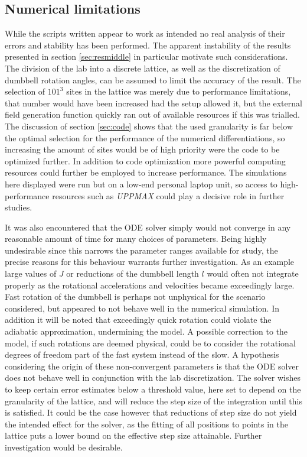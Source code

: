 \documentclass[main.tex]{subfiles}
\begin{document}
\subsection{Numerical limitations}
While the scripts written appear to work as intended no real analysis of their errors and
stability has been performed. The apparent instability of the results presented in section
\ref{sec:resmiddle} in particular motivate such considerations. The division of the lab into a discrete lattice, as well as
the discretization of dumbbell rotation angles, can be assumed to limit the accuracy of the
result. The selection of \(101^3\) sites in the lattice was merely due to performance
limitations, that number would have been increased had the setup allowed it, but the external
field generation function quickly ran out of available resources if this was trialled. The
discussion of section \ref{sec:code} shows that the used granularity is far below the
optimal selection for the performance of the numerical differentiations, so increasing the
amount of sites would be of high priority were the code to be optimized further. In
addition to code optimization more powerful computing resources could
further be employed to increase performance. The simulations here displayed were run but on
a low-end personal laptop unit, so access to high-performance resources such as \textit{UPPMAX} \cite{UPPMAX} could play a
decisive role in further studies.

It was also encountered that the ODE solver simply would not converge in any
reasonable amount of time for many
choices of parameters. Being highly undesirable since this narrows the parameter ranges available
for study, the precise reasons for this behaviour warrants further investigation. As an
example large values of \(J\) or reductions of the dumbbell length \(l\) would often not
integrate properly as the rotational accelerations and velocities became exceedingly large.
Fast rotation of the dumbbell is perhaps not unphysical for the scenario considered, but
appeared to not behave well in the numerical simulation. In addition it will be noted that
exceedingly quick rotation could violate the adiabatic approximation, undermining the
model. A possible correction to the model, if such rotations are deemed physical, could be to consider
the rotational degrees of freedom part of the fast system instead of the slow. A hypothesis considering the origin of these non-convergent parameters is that the
ODE solver does not behave well in conjunction with the lab discretization. The solver
wishes to keep certain error estimates below a threshold value, here set to depend on the
granularity of the lattice, and will reduce the step size of the integration until this is
satisfied. It could be the case however that reductions of step size do not yield the
intended effect for the solver, as the fitting of all positions to points in the lattice
puts a lower bound on the effective step size attainable. Further investigation would be
desirable.
\end{document}
